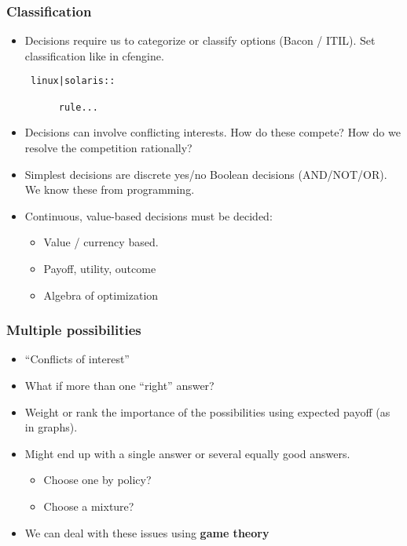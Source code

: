 \documentclass{beamer}
\begin{document}
\begin{frame}
\frametitle{Classification}

\begin{itemize}
\item Decisions require us to categorize or classify options (Bacon / ITIL). Set classification
like in cfengine.\vspace{0.2cm}

{\tt\small
linux|solaris::\\
~\\
~~~~~   rule...}

\item Decisions can involve conflicting interests. How do these compete?
How do we resolve the competition rationally?\vspace{0.2cm}

\item Simplest decisions are discrete yes/no Boolean
decisions (AND/NOT/OR). We know these from programming.\vspace{0.2cm}

\item Continuous, value-based decisions must be decided:\vspace{0.2cm}
\begin{itemize}
\item Value / currency based.
\item Payoff, utility, outcome
\item Algebra of optimization
\end{itemize}
\end{itemize}

\end{frame}


\begin{frame}\frametitle{Multiple possibilities}

\begin{itemize}
\item ``Conflicts of interest''\vspace{0.3cm}

\item What if more than one ``right'' answer?\vspace{0.2cm}

\item Weight or rank the importance of the possibilities using expected
payoff (as in graphs).\vspace{0.2cm}

\item Might end up with a single answer or several equally good answers.\vspace{0.2cm}

\begin{itemize}
\item Choose one by policy?
\item Choose a mixture?
\end{itemize}

\item We can deal with these issues using {\bf game theory}
\end{itemize}
\end{frame}
\end{document}
